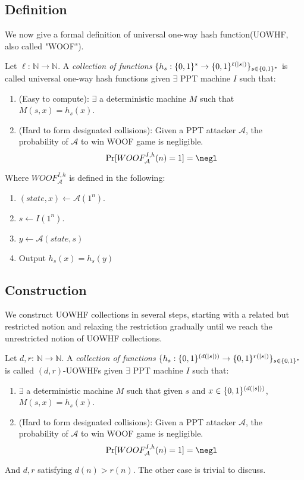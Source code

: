 \subsection{Definition}
We now give a formal definition of universal one-way hash function(UOWHF, also called "WOOF"). 
\begin{definition}
    Let $\ell$: $\mathbb{N}\rightarrow\mathbb{N}$. A \textit{collection of functions} 
    $\{h_s: \{0,1\}^*\rightarrow\{0,1\}^{\ell(|s|)}\}_{s\in\{0,1\}^{*}}$ is called universal one-way hash functions given $\exists$ PPT machine $I$ such that: 
    \begin{enumerate}
        \item (Easy to compute): $\exists$ a deterministic machine $M$ such that $M(s,x)=h_s(x)$.
        \item (Hard to form designated collisions): Given a PPT attacker $\mathcal{A}$, the probability of $\mathcal{A}$ to win WOOF game is negligible. 
        \[
            \Pr[WOOF^{I,h}_{\mathcal{A}}(n)=1]=\negl
        \]
    \end{enumerate}
\end{definition}
Where $WOOF^{I,h}_{\mathcal{A}}$ is defined in the following:
\begin{enumerate}
    \item $(state, x)\leftarrow\mathcal{A}(1^n)$.
    \item $s\leftarrow I(1^n)$.
    \item $y\leftarrow\mathcal{A}(state, s)$
    \item Output $h_s(x)=h_s(y)$
\end{enumerate}


\subsection{Construction}
We construct UOWHF collections in several steps, starting with a related but
restricted notion and relaxing the restriction gradually until we reach the unrestricted notion of UOWHF collections. 

\begin{definition}[$(d,r)$-UOWHFs]
Let $d,r$: $\mathbb{N}\rightarrow\mathbb{N}$. A \textit{collection of functions} 
    $\{h_s: \{0,1\}^{(d(|s|))}\rightarrow\{0,1\}^{r(|s|)}\}_{s\in\{0,1\}^{*}}$ is called  $(d,r)$-UOWHFs given $\exists$ PPT machine $I$ such that: 
    \begin{enumerate}
        \item $\exists$ a deterministic machine $M$ such that given $s$ and $x\in\{0,1\}^{(d(|s|))}$, $M(s,x)=h_s(x)$.
        \item (Hard to form designated collisions): Given a PPT attacker $\mathcal{A}$, the probability of $\mathcal{A}$ to win WOOF game is negligible. 
        \[
            \Pr[WOOF^{I,h}_{\mathcal{A}}(n)=1]=\negl
        \]
    \end{enumerate}
\end{definition}
And $d,r$ satisfying $d(n)>r(n)$. The other case is trivial to discuss. 

